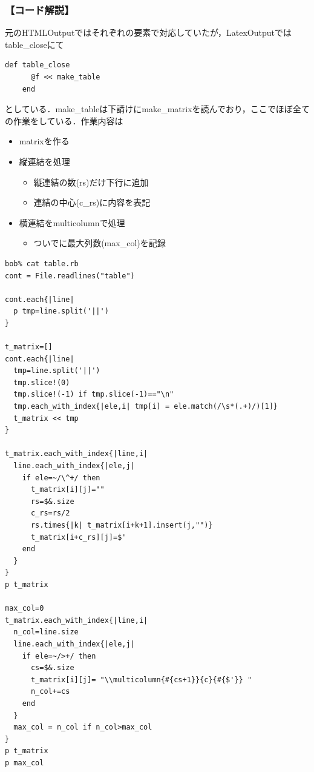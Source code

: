 \subsubsection{【コード解説】}
元のHTMLOutputではそれぞれの要素で対応していたが，LatexOutputではtable\_closeにて
\begin{lstlisting}[style=customRuby]
    def table_close
      @f << make_table
    end
\end{lstlisting}
としている．make\_tableは下請けにmake\_matrixを読んでおり，ここでほぼ全ての作業をしている．作業内容は
\begin{itemize}
\item matrixを作る
\item 縦連結を処理\begin{itemize}
\item 縦連結の数(rs)だけ下行に追加
\item 連結の中心(c\_rs)に内容を表記
\end{itemize}
\item 横連結をmulticolumnで処理\begin{itemize}
\item ついでに最大列数(max\_col)を記録
\end{itemize}
\end{itemize}\begin{lstlisting}[style=customRuby]
bob% cat table.rb
cont = File.readlines("table")

cont.each{|line|
  p tmp=line.split('||')
}

t_matrix=[]
cont.each{|line|
  tmp=line.split('||')
  tmp.slice!(0)
  tmp.slice!(-1) if tmp.slice(-1)=="\n"
  tmp.each_with_index{|ele,i| tmp[i] = ele.match(/\s*(.+)/)[1]}
  t_matrix << tmp
}

t_matrix.each_with_index{|line,i|
  line.each_with_index{|ele,j|
    if ele=~/\^+/ then
      t_matrix[i][j]=""
      rs=$&.size
      c_rs=rs/2
      rs.times{|k| t_matrix[i+k+1].insert(j,"")}
      t_matrix[i+c_rs][j]=$'
    end
  }
}
p t_matrix

max_col=0
t_matrix.each_with_index{|line,i|
  n_col=line.size
  line.each_with_index{|ele,j|
    if ele=~/>+/ then
      cs=$&.size
      t_matrix[i][j]= "\\multicolumn{#{cs+1}}{c}{#{$'}} "
      n_col+=cs
    end
  }
  max_col = n_col if n_col>max_col
}
p t_matrix
p max_col
\end{lstlisting}
